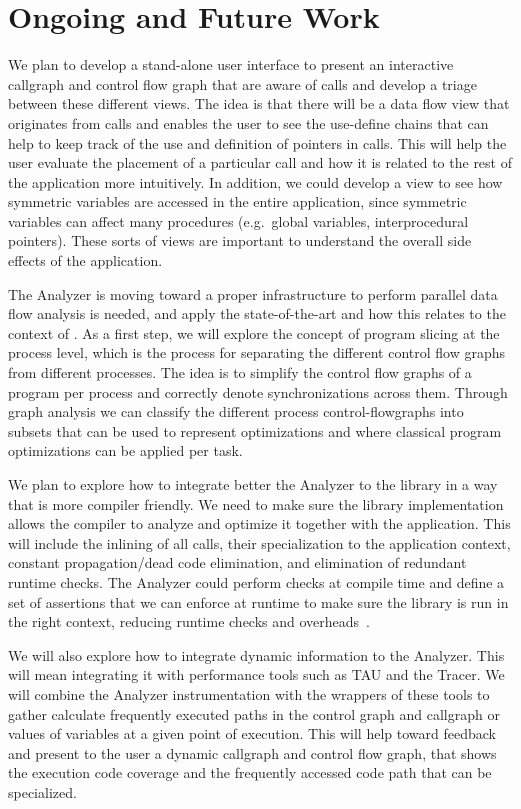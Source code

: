 \section{Ongoing and Future Work}
\label{chapter:future}

We plan to develop a stand-alone user interface to present an
interactive callgraph and control flow graph that are aware of
\openshmem calls and develop a triage between these different views.
The idea is that there will be a data flow view that originates from
\openshmem calls and enables the user to see the use-define chains that
can help to keep track of the use and definition of pointers in
\openshmem calls. This will help the user evaluate the placement of a
particular call and how it is related to the rest of the application
more intuitively.  In addition, we could develop a view to see how
symmetric variables are accessed in the entire application, since
symmetric variables can affect many procedures (e.g.\ global variables,
interprocedural pointers). These sorts of views are important to
understand the overall side effects of the application.

The \openshmem Analyzer is moving toward a proper infrastructure to
perform parallel data flow analysis is needed, and apply the
state-of-the-art and how this relates to the context of \openshmem. As
a first step, we will explore the concept of program slicing at the
process level, which is the process for separating the different
control flow graphs from different processes. The idea is to simplify
the control flow graphs of a program per process and correctly denote
synchronizations across them. Through graph analysis we can classify
the different process control-flowgraphs into subsets that can be used
to represent optimizations and where classical program optimizations
can be applied per \openshmem task.

We plan to explore how to integrate better the \openshmem Analyzer to
the \openshmem library in a way that is more compiler friendly. We
need to make sure the library implementation allows the compiler to
analyze and optimize it together with the application. This will
include the inlining of all \openshmem calls, their specialization to
the application context, constant propagation/dead code elimination,
and elimination of redundant runtime checks. The \openshmem Analyzer
could perform checks at compile time and define a set of assertions
that we can enforce at runtime to make sure the library is run in the
right context, reducing runtime checks and
overheads~\cite{DBLP:conf/openshmem/PophaleHPC14,SwaroopPGAS13}.

We will also explore how to integrate dynamic information to the
\openshmem Analyzer. This will mean integrating it with performance
tools such as TAU and the \openshmem Tracer. We will combine the
\openshmem Analyzer instrumentation with the \openshmem wrappers of
these tools to gather calculate frequently executed paths in the
control graph and callgraph or values of variables at a given point of
execution. This will help toward feedback and present to the user a
dynamic callgraph and control flow graph, that shows the execution
code coverage and the frequently accessed code path that can be
specialized.

